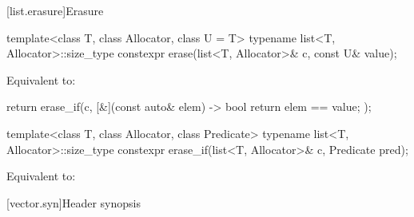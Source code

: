[list.erasure]{Erasure}

%
\begin{itemdecl}
template<class T, class Allocator, class U = T>
  typename list<T, Allocator>::size_type
    constexpr erase(list<T, Allocator>& c, const U& value);
\end{itemdecl}

\begin{itemdescr}
\pnum
\effects
Equivalent to:
\begin{codeblock}
return erase_if(c, [&](const auto& elem) -> bool { return elem == value; });
\end{codeblock}
\end{itemdescr}

%
\begin{itemdecl}
template<class T, class Allocator, class Predicate>
  typename list<T, Allocator>::size_type
    constexpr erase_if(list<T, Allocator>& c, Predicate pred);
\end{itemdecl}

\begin{itemdescr}
\pnum
\effects
Equivalent to: 
\end{itemdescr}

[vector.syn]{Header  synopsis}

